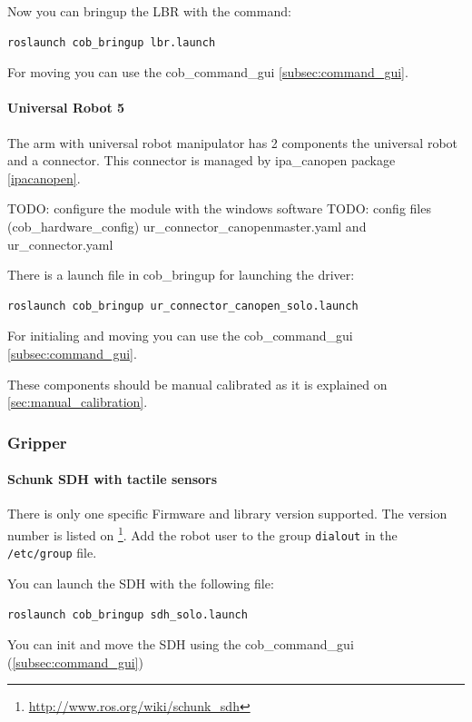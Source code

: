 Now you can bringup the LBR with the command:
\begin{lstlisting}
roslaunch cob_bringup lbr.launch
\end{lstlisting}

For moving you can use the cob\_command\_gui \ref{subsec:command_gui}.

\paragraph{Universal Robot 5}

The arm with universal robot manipulator has 2 components the universal robot and a connector. This connector is managed by ipa\_canopen package \ref{ipacanopen}.

TODO: configure the module with the windows software
TODO: config files (cob\_hardware\_config)  ur\_connector\_canopenmaster.yaml and ur\_connector.yaml


There is a launch file in cob\_bringup for launching the driver:

\begin{lstlisting}
roslaunch cob_bringup ur_connector_canopen_solo.launch
\end{lstlisting}

For initialing and moving you can use the cob\_command\_gui \ref{subsec:command_gui}.

These components should be manual calibrated as it is explained on \ref{sec:manual_calibration}.


\subsubsection{Gripper}

\paragraph{Schunk SDH with tactile sensors}
There is only one specific Firmware and library version supported. The version number is listed on \footnote{\url{http://www.ros.org/wiki/schunk_sdh}}. Add the robot user to the group \texttt{dialout} in the \texttt{/etc/group} file.

You can launch the SDH with the following file:
\begin{lstlisting}
roslaunch cob_bringup sdh_solo.launch
\end{lstlisting}

You can init and move the SDH using the cob\_command\_gui (\ref{subsec:command_gui})

